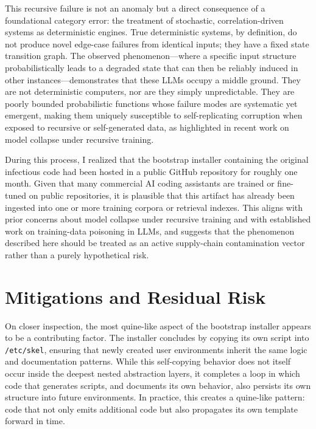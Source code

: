 \documentclass[11pt]{article}
\begin{document}
This recursive failure is not an anomaly but a direct consequence of a foundational category error: the treatment of stochastic, correlation-driven systems as deterministic engines.\cite{shumailov2023a,bommasani2024} True deterministic systems, by definition, do not produce novel edge-case failures from identical inputs; they have a fixed state transition graph. The observed phenomenon—where a specific input structure probabilistically leads to a degraded state that can then be reliably induced in other instances—demonstrates that these LLMs occupy a middle ground.\cite{shumailov2023b} They are not deterministic computers, nor are they simply unpredictable. They are poorly bounded probabilistic functions whose failure modes are systematic yet emergent, making them uniquely susceptible to self-replicating corruption when exposed to recursive or self-generated data, as highlighted in recent work on model collapse under recursive training.\cite{shumailov2023a,bommasani2024}

During this process, I realized that the bootstrap installer containing the original infectious code had been hosted in a public GitHub repository for roughly one month. Given that many commercial AI coding assistants are trained or fine-tuned on public repositories, it is plausible that this artifact has already been ingested into one or more training corpora or retrieval indexes.\cite{cylab2025,owasp2025} This aligns with prior concerns about model collapse under recursive training and with established work on training-data poisoning in LLMs, and suggests that the phenomenon described here should be treated as an active supply-chain contamination vector rather than a purely hypothetical risk.\cite{bommasani2024,cylab2025,owasp2025}

\section{Mitigations and Residual Risk}
On closer inspection, the most quine-like aspect of the bootstrap installer appears to be a contributing factor. The installer concludes by copying its own script into \texttt{/etc/skel}, ensuring that newly created user environments inherit the same logic and documentation patterns. While this self-copying behavior does not itself occur inside the deepest nested abstraction layers, it completes a loop in which code that generates scripts, and documents its own behavior, also persists its own structure into future environments. In practice, this creates a quine-like pattern: code that not only emits additional code but also propagates its own template forward in time.
\end{document}

